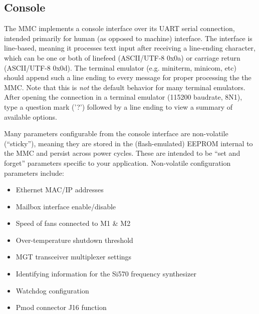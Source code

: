 \documentclass[12pt,oneside,a4]{article}
\begin{document}
\subsection{Console}\label{sec:MMC:Console}
The MMC implements a console interface over its UART serial connection, intended primarily for human (as opposed to machine) interface.
The interface is line-based, meaning it processes text input after receiving a line-ending character, which can be one or both of
linefeed (ASCII/UTF-8 0x0a) or carriage return (ASCII/UTF-8 0x0d).
The terminal emulator (e.g. miniterm, minicom, etc) should append such a line ending to every message for proper processing the the MMC.
Note that this is \emph{not} the default behavior for many terminal emulators.
After opening the connection in a terminal emulator (115200 baudrate, 8N1), type a question mark ('?') followed by a line ending to
view a summary of available options.

Many parameters configurable from the console interface are non-volatile (``sticky''), meaning they are stored in the (flash-emulated) EEPROM
internal to the MMC and persist across power cycles.  These are intended to be ``set and forget'' parameters specific to your application.
Non-volatile configuration parameters include:
\begin{itemize}
	\item{Ethernet MAC/IP addresses}
	\item{Mailbox interface enable/disable}
	\item{Speed of fans connected to M1 \& M2}
	\item{Over-temperature shutdown threshold}
	\item{MGT transceiver multiplexer settings}
	\item{Identifying information for the Si570 frequency synthesizer}
	\item{Watchdog configuration}
	\item{Pmod connector J16 function}
\end{itemize}
\end{document}
